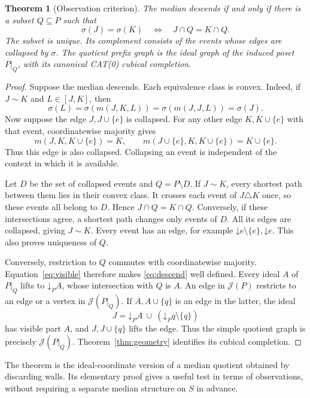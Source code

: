 \documentclass[11pt]{article}
\newtheorem{theorem}{Theorem}[section]
\theoremstyle{definition}
\newcommand{\Id}{\mathcal J}
\numberwithin{equation}{section}
\begin{document}
\begin{theorem}[Observation criterion]\label{thm:observation}
The median descends if and only if there is a subset $Q\subseteq P$
such that
\begin{equation}\label{eq:visible}
 \sigma(J)=\sigma(K)\quad\Longleftrightarrow\quad J\cap Q=K\cap Q.
\end{equation}
The subset is unique. Its complement consists of the events whose
edges are collapsed by $\sigma$.
The quotient prefix graph is the ideal graph of the induced poset
$P|_Q$, with its canonical CAT(0) cubical completion.
\end{theorem}
\begin{proof}
Suppose the median descends. Each equivalence class is convex.
Indeed, if $J\sim K$ and $L\in[J,K]$, then
\[
 \sigma(L)=\sigma(m(J,K,L))=\sigma(m(J,J,L))=\sigma(J).
\]
Now suppose the edge $J,J\cup\{e\}$ is collapsed. For any other
edge $K,K\cup\{e\}$ with that event, coordinatewise majority gives
\[
 m(J,K,K\cup\{e\})=K,\qquad
 m(J\cup\{e\},K,K\cup\{e\})=K\cup\{e\}.
\]
Thus this edge is also collapsed. Collapsing an event is independent
of the context in which it is available.

Let $D$ be the set of collapsed events and $Q=P\setminus D$.
If $J\sim K$, every shortest path between them lies in their
convex class. It crosses each event of $J\triangle K$ once,
so these events all belong to $D$. Hence $J\cap Q=K\cap Q$.
Conversely, if these intersections agree, a shortest path changes
only events of $D$. All its edges are collapsed, giving $J\sim K$.
Every event has an edge, for example
$\mathord\downarrow e\setminus\{e\},\mathord\downarrow e$.
This also proves uniqueness of $Q$.

Conversely, restriction to $Q$ commutes with coordinatewise majority.
Equation~\eqref{eq:visible} therefore makes \eqref{eq:descend}
well defined.
Every ideal $A$ of $P|_Q$ lifts to $\mathord\downarrow_PA$, whose
intersection with $Q$ is $A$. An edge in $\Id(P)$ restricts to an
edge or a vertex in $\Id(P|_Q)$.
If $A,A\cup\{q\}$ is an edge in the latter, the ideal
\[
 J=\mathord\downarrow_PA\ \cup\
                     (\mathord\downarrow_Pq\setminus\{q\})
\]
has visible part $A$, and $J,J\cup\{q\}$ lifts the edge.
Thus the simple quotient graph is precisely $\Id(P|_Q)$.
Theorem~\ref{thm:geometry} identifies its cubical completion.
\end{proof}

The theorem is the ideal-coordinate version of a median quotient
obtained by discarding walls. Its elementary proof gives a useful
test in terms of observations, without requiring a separate
median structure on $S$ in advance.
\end{document}
